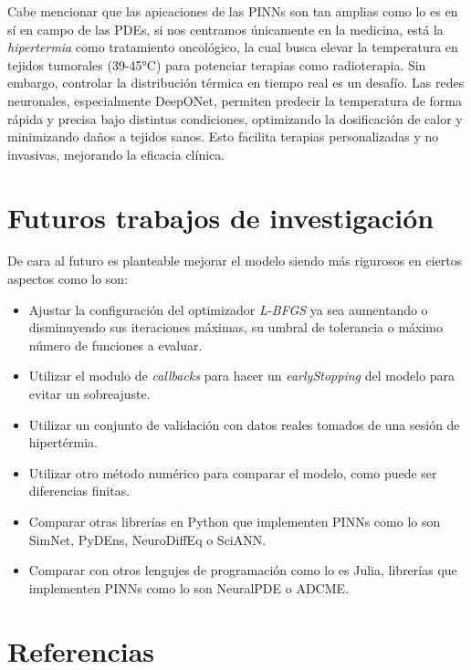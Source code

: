 \documentclass[
  spanish,
  us-letterpaper,
]{scrreprt}
\theoremstyle{plain}
\theoremstyle{definition}
\theoremstyle{remark}
\begin{document}
Cabe mencionar que las apicaciones de las PINNs son tan amplias como lo
es en sí en campo de las PDEs, si nos centramos únicamente en la
medicina, está la \emph{hipertermia} como tratamiento oncológico, la
cual busca elevar la temperatura en tejidos tumorales (39-45°C) para
potenciar terapias como radioterapia. Sin embargo, controlar la
distribución térmica en tiempo real es un desafío. Las redes neuronales,
especialmente DeepONet, permiten predecir la temperatura de forma rápida
y precisa bajo distintas condiciones, optimizando la dosificación de
calor y minimizando daños a tejidos sanos. Esto facilita terapias
personalizadas y no invasivas, mejorando la eficacia clínica.


\chapter{Futuros trabajos de
investigación}\label{futuros-trabajos-de-investigaciuxf3n}

De cara al futuro es planteable mejorar el modelo siendo más rigurosos
en ciertos aspectos como lo son:

\begin{itemize}
\item
  Ajustar la configuración del optimizador \emph{L-BFGS} ya sea
  aumentando o disminuyendo sus iteraciones máximas, su umbral de
  tolerancia o máximo número de funciones a evaluar.
\item
  Utilizar el modulo de \emph{callbacks} para hacer un
  \emph{earlyStopping} del modelo para evitar un sobreajuste.
\item
  Utilizar un conjunto de validación con datos reales tomados de una
  sesión de hipertérmia.
\item
  Utilizar otro método numérico para comparar el modelo, como puede ser
  diferencias finitas.
\item
  Comparar otras librerías en Python que implementen PINNs como lo son
  SimNet, PyDEns, NeuroDiffEq o SciANN.
\item
  Comparar con otros lengujes de programación como lo es Julia,
  librerías que implementen PINNs como lo son NeuralPDE o ADCME.
\end{itemize}


\chapter*{Referencias}\label{referencias}
\end{document}
